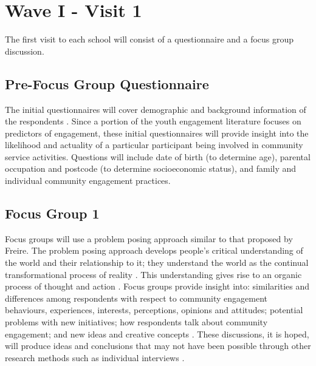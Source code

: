 \section{Wave I - Visit 1}
The first visit to each school will consist of a questionnaire and a focus group discussion. 

\subsection{Pre-Focus Group Questionnaire}
The initial questionnaires will cover demographic and background information of the respondents \citep{Johnson2010}. Since a portion of the youth engagement literature focuses on predictors of engagement, these initial questionnaires will provide insight into the likelihood and actuality of a particular participant being involved in community service activities. Questions will include date of birth (to determine age), parental occupation and postcode (to determine socioeconomic status), and family and individual community engagement practices. 


\subsection{Focus Group 1}

Focus groups will use a problem posing approach similar to that proposed by Freire. The problem posing approach develops people's critical understanding of the world and their relationship to it; they understand the world as the continual transformational process of reality \citep{Freire2000}. This understanding gives rise to an organic process of thought and action \citep{Freire2000}. Focus groups provide insight into: similarities and differences among respondents with respect to community engagement behaviours, experiences, interests, perceptions, opinions and attitudes; potential problems with new initiatives; how respondents talk about community engagement; and new ideas and creative concepts \citep[][p591]{Stewart2009}. These discussions, it is hoped, will produce ideas and conclusions that may not have been possible through other research methods such as individual interviews \citep{Stewart2009}. 

